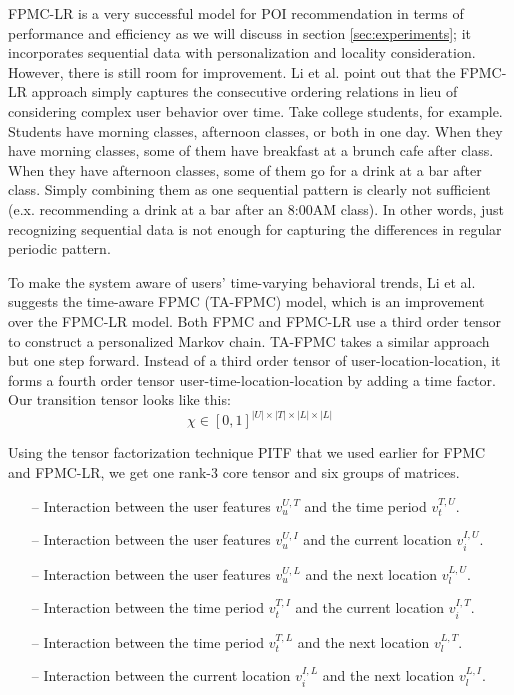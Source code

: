 \documentclass{sig-alternate}
\begin{document}
FPMC-LR is a very successful model for POI recommendation in terms of performance and efficiency 
as we will discuss in section \ref{sec:experiments}; it incorporates sequential data with personalization and locality consideration. 
However, there is still room for improvement. Li et al. \cite{Li:2017} point out that the FPMC-LR approach simply captures 
the consecutive ordering relations in lieu of considering complex user behavior over time. Take college students, 
for example. Students have morning classes, afternoon classes, or both in one day. When they have morning classes, 
some of them have breakfast at a brunch cafe after class. When they have afternoon classes, some of them go 
for a drink at a bar after class. Simply combining them as one sequential pattern is clearly not sufficient (e.x. recommending a drink at a bar after an 8:00AM class). In other words, just recognizing sequential data is not 
enough for capturing the differences in regular periodic pattern.

To make the system aware of users' time-varying behavioral trends, Li et al. \cite{Li:2017} suggests the time-aware FPMC (TA-FPMC) 
model, which is an improvement over the FPMC-LR model. Both FPMC and FPMC-LR use a third order tensor to 
construct a personalized Markov chain. TA-FPMC takes a similar approach but one step forward. Instead of a third order tensor of 
user-location-location, it forms a fourth order tensor user-time-location-location by adding a time factor. Our transition tensor looks like this: 
\begin{equation}
	\chi \in [0, 1]^{|U| \times |T| \times |L| \times |L|}
\label{eq:TA-FPMC_tensor}
\end{equation}

Using the tensor factorization technique PITF that we used earlier for FPMC and FPMC-LR, we get 
one rank-3 core tensor and six groups of matrices.

\begin{itemize}
\item[--] Interaction between the user features $v_u^{U,T}$ and the time period $v_t^{T,U}$.
\item[--] Interaction between the user features $v_u^{U,I}$ and the current location $v_i^{I,U}$.
\item[--] Interaction between the user features $v_u^{U,L}$ and the next location $v_l^{L,U}$.
\item[--] Interaction between the time period $v_t^{T,I}$ and the current location $v_i^{I,T}$.
\item[--] Interaction between the time period $v_t^{T,L}$ and the next location $v_l^{L,T}$.
\item[--] Interaction between the current location $v_i^{I,L}$ and the next location $v_l^{L,I}$.
\end{itemize}
\end{document}
